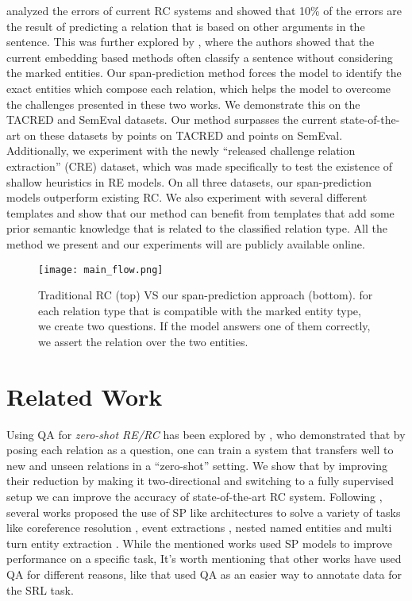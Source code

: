 \documentclass[11pt]{article}
\begin{document}
\citet{Alt2020} analyzed the errors of current RC systems and showed that 10\% of the errors are the result of predicting a relation that is based on other arguments in the sentence. This was further explored by \cite{Rosenman2020}, where the authors showed that the current embedding based methods often classify a sentence without considering the marked entities. Our span-prediction method forces the model to identify the exact entities which compose each relation, which helps the model to overcome the challenges presented in these two works. 
We demonstrate this on the TACRED and SemEval datasets. Our method surpasses the current state-of-the-art on these datasets by  points on TACRED and  points on SemEval. Additionally, we experiment with the newly ``released challenge relation extraction'' (CRE) dataset, which was made specifically to test the existence of shallow heuristics in RE models. On all three datasets, our span-prediction models outperform existing RC. We also experiment with several different templates and show that our method can benefit from templates that add some prior semantic knowledge that is related to the classified relation type. All the method we present and our experiments will are publicly available online.

\begin{figure*}[h]
\centering
\texttt{[image: main\_flow.png]}
\caption{Traditional RC (top) VS our span-prediction approach (bottom). for each relation type that is compatible with the marked entity type, we create two questions. If the model answers one of them correctly, we assert the relation over the two entities.} \label{fig:main}
\end{figure*}

\section{Related Work}
Using QA for \emph{zero-shot RE/RC} has been explored by \citet{Levy2017},
who demonstrated that by posing each relation as a question, one can train a system that transfers well to new and unseen relations in a ``zero-shot'' setting. We show that by improving their reduction by making it two-directional and switching to a fully supervised setup we can improve the accuracy of state-of-the-art RC system. Following \citet{Levy2017}, several works proposed the use of 
 SP like architectures to solve a variety of tasks like coreference resolution \cite{Wu2019}, event extractions \cite{Du2020}, nested named entities \cite{Li2019b} and multi turn entity extraction \cite{Li2019}.
While the mentioned works used SP models to improve performance on a specific task, It's worth mentioning that other works have used QA for different reasons, like \cite{He2015} that used QA as an easier way to annotate data for the SRL task.
\end{document}
